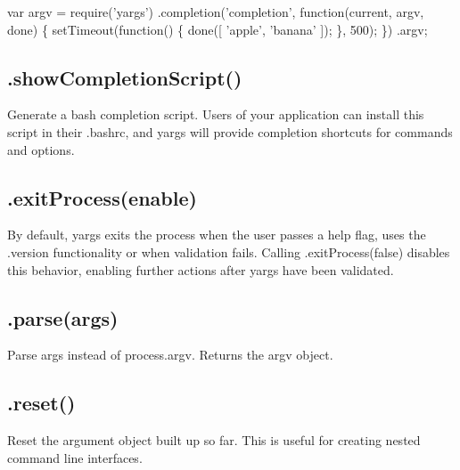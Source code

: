 \begin{DoxyCode}
var argv = require(\textcolor{stringliteral}{'yargs'})
  .completion(\textcolor{stringliteral}{'completion'}, \textcolor{keyword}{function}(current, argv, done) \{
    setTimeout(\textcolor{keyword}{function}() \{
      done([
        \textcolor{stringliteral}{'apple'},
        \textcolor{stringliteral}{'banana'}
      ]);
    \}, 500);
  \})
  .argv;
\end{DoxyCode}


\subsection*{.show\+Completion\+Script() }

Generate a bash completion script. Users of your application can install this script in their {\ttfamily .bashrc}, and yargs will provide completion shortcuts for commands and options.

\subsection*{.exit\+Process(enable) }

By default, yargs exits the process when the user passes a help flag, uses the {\ttfamily .version} functionality or when validation fails. Calling {\ttfamily .exit\+Process(false)} disables this behavior, enabling further actions after yargs have been validated.

\subsection*{.parse(args) }

Parse {\ttfamily args} instead of {\ttfamily process.\+argv}. Returns the {\ttfamily argv} object.

\subsection*{.reset() }

Reset the argument object built up so far. This is useful for creating nested command line interfaces.


